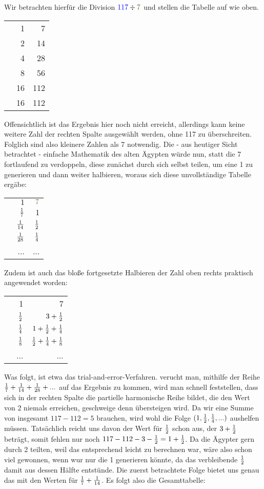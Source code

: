 	\begin{bsp}
		Wir betrachten hierfür die Division $\textcolor{blue}{117} \div \textcolor{OliveGreen}{7}$ und stellen die Tabelle auf wie oben.
		\begin{center}
			\begin{tabular}{r r r}
				& 1 & \textcolor{OliveGreen}{7}\\
				& 2 & 14\\
				& 4 & 28\\
				& 8 & 56\\
				\checkmark & 16 & 112\\ \hline
				\ding{53}& 16 & 112
			\end{tabular}
		\end{center}
		Offensichtlich ist das Ergebnis hier noch nicht erreicht, allerdings kann keine weitere Zahl der rechten Spalte ausgewählt werden, ohne 117 zu überschreiten. Folglich sind also kleinere Zahlen als 7 notwendig. Die - aus heutiger Sicht betrachtet - einfache Mathematik des alten Ägypten würde nun, statt die 7 fortlaufend zu verdoppeln, diese zunächst durch sich selbst teilen, um eine 1 zu generieren und dann weiter halbieren, woraus sich diese unvollständige Tabelle ergäbe:
		\begin{center}
			\begin{tabular}{r r r}
				& $1$ & $\textcolor{OliveGreen}{7}$\\
				& $\frac{1}{7}$ & $1$\\
				& $\frac{1}{14}$ & $\frac{1}{2}$\\
				& $\frac{1}{28}$ & $\frac{1}{4}$\\
				& ... & ...\\
			\end{tabular}
		\end{center}
		Zudem ist auch das bloße fortgesetzte Halbieren der Zahl oben rechts praktisch angewendet worden:
		\begin{center}
			\begin{tabular}{r r r}
				& 1 & \textcolor{OliveGreen}{7}\\
				& $\frac{1}{2}$ & $3+\frac{1}{2}$\\
				& $\frac{1}{4}$ & $1+\frac{1}{2}+\frac{1}{4}$\\
				& $\frac{1}{8}$ & $\frac{1}{2}+\frac{1}{4}+\frac{1}{8}$\\
				&...&...
			\end{tabular}
		\end{center}
		Was folgt, ist etwa das trial-and-error-Verfahren. verucht man, mithilfe der Reihe $\frac{1}{7}+\frac{1}{14}+\frac{1}{28}+...$ auf das Ergebnis zu kommen, wird man schnell feststellen, dass sich in der rechten Spalte die partielle harmonische Reihe bildet, die den Wert von 2 niemals erreichen, geschweige denn übersteigen wird. Da wir eine Summe von insgesamt $117-112=5$ brauchen, wird wohl die Folge $(1, \frac{1}{2}, \frac{1}{4}, ...)$ aushelfen müssen. Tatsächlich reicht uns davon der Wert für $\frac{1}{2}$ schon aus, der $3+\frac{1}{2}$ beträgt, somit fehlen nur noch $117-112-3-\frac{1}{2}=1+\frac{1}{2}$. Da die Ägypter gern durch 2 teilten, weil das entsprechend leicht zu berechnen war, wäre also schon viel gewonnen, wenn wur nur die 1 generieren könnte, da das verbleibende $\frac{1}{2}$ damit aus dessen Hälfte entstünde. Die zuerst betrachtete Folge bietet uns genau das mit den Werten für $\frac{1}{7} + \frac{1}{14}$. Es folgt also die Gesamttabelle:

\end{bsp}
